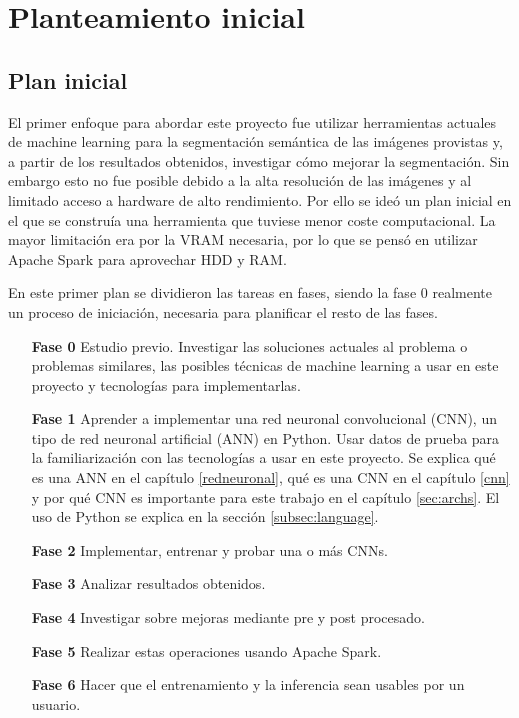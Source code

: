 \chapter{Planteamiento inicial}\label{planinicial}

\section{Plan inicial}\label{sec:planinicial}

El primer enfoque para abordar este proyecto fue utilizar herramientas actuales de machine learning para la segmentación semántica de las imágenes provistas y, a partir de los resultados obtenidos, investigar cómo mejorar la segmentación. Sin embargo esto no fue posible debido a la alta resolución de las imágenes y al limitado acceso a hardware de alto rendimiento. Por ello se ideó un plan inicial en el que se construía una herramienta que tuviese menor coste computacional. La mayor limitación era por la VRAM necesaria, por lo que se pensó en utilizar Apache Spark \cite{apachespark} para aprovechar HDD y RAM.

En este primer plan se dividieron las tareas en fases, siendo la fase 0 realmente un proceso de iniciación, necesaria para planificar el resto de las fases.

\begin{itemize}
\item[\textbf{Fase 0}] Estudio previo. Investigar las soluciones actuales al problema o problemas similares, las posibles técnicas de machine learning a usar en este proyecto y tecnologías para implementarlas.
\item[\textbf{Fase 1}] Aprender a implementar una red neuronal convolucional (CNN), un tipo de red neuronal artificial (ANN) en Python. Usar datos de prueba para la familiarización con las tecnologías a usar en este proyecto. Se explica qué es una ANN en el capítulo \ref{redneuronal}, qué es una CNN en el capítulo \ref{cnn} y por qué CNN es importante para este trabajo en el capítulo \ref{sec:archs}. El uso de Python se explica en la sección \ref{subsec:language}.
\item[\textbf{Fase 2}] Implementar, entrenar y probar una o más CNNs.
\item[\textbf{Fase 3}] Analizar resultados obtenidos.
\item[\textbf{Fase 4}] Investigar sobre mejoras mediante pre y post procesado.
\item[\textbf{Fase 5}] Realizar estas operaciones usando Apache Spark.
\item[\textbf{Fase 6}] Hacer que el entrenamiento y la inferencia sean usables por un usuario.
\end{itemize}

